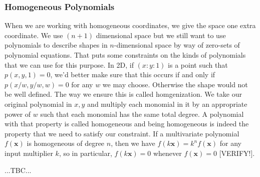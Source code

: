 
\subsubsection{Homogeneous Polynomials}
When we are working with homogeneous coordinates, we give the space one extra coordinate. We use $(n+1)$ dimensional space but we still want to use polynomials to describe shapes in $n$-dimensional space by way of zero-sets of polynomial equations. That puts some constraints on the kinds of polynomials that we can use for this purpose. In 2D, if $(x : y : 1)$ is a point such that $p(x,y,1) = 0$, we'd better make sure that this occurs if and only if $p(x/w, y/w, w) = 0$ for any $w$ we may choose. Otherwise the shape would not be well defined. The way we ensure this is called homgenization. We take our original polynomial in $x,y$ and multiply each monomial in it by an appropriate power of $w$ such that each monomial has the same total degree. A polynomial with that property is called homogeneous and being homogeneous is indeed the property that we need to satisfy our constraint. If a multivariate polynomial $f(\mathbf{x})$ is homogeneous of degree $n$, then we have $f(k \mathbf{x}) = k^n f(\mathbf{x})$ for any input multiplier $k$, so in particular, $f(k \mathbf{x}) = 0$ whenever $f(\mathbf{x}) = 0$ [VERIFY!].

...TBC...





